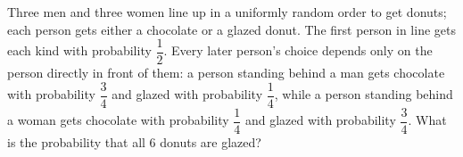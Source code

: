 Three men and three women line up in a uniformly random order to get donuts; each person gets either a chocolate or a glazed donut. The first person in line gets each kind with probability $\dfrac{1}{2}$. Every later person's choice depends only on the person directly in front of them: a person standing behind a man gets chocolate with probability $\dfrac{3}{4}$ and glazed with probability $\dfrac{1}{4}$, while a person standing behind a woman gets chocolate with probability $\dfrac{1}{4}$ and glazed with probability $\dfrac{3}{4}$. What is the probability that all $6$ donuts are glazed?
